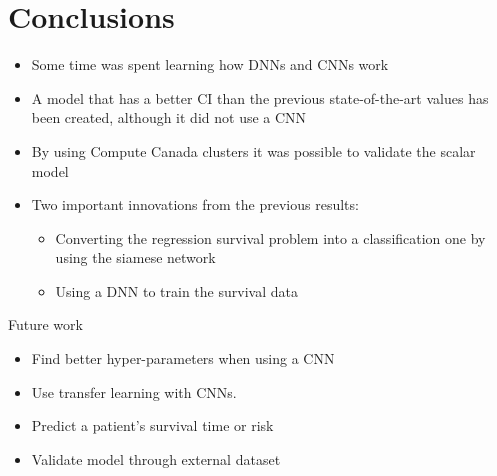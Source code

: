 
\section{Conclusions}

\begin{frame}
  \begin{itemize}
    \item Some time was spent learning how DNNs and CNNs work
    \item A model that has a better CI than the previous state-of-the-art values has been created,
    although it did not use a CNN
    \item By using Compute Canada clusters it was possible to validate the scalar model
    \item Two important innovations from the previous results:
    \begin{itemize}
      \item Converting the regression survival problem into a classification one by using 
      the siamese network
      \item Using a DNN to train the survival data
    \end{itemize}
  \end{itemize}
\end{frame}

\begin{frame}{Future work}
  \begin{itemize}
    \item Find better hyper-parameters when using a CNN
    \item Use transfer learning with CNNs.
    \item Predict a patient's survival time or risk
    \item Validate model through external dataset
  \end{itemize}
\end{frame}
